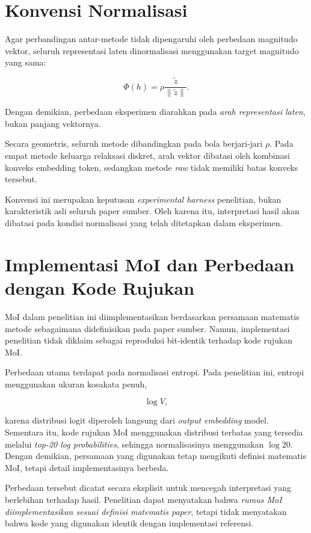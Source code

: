 \section{Konvensi Normalisasi}

Agar perbandingan antar-metode tidak dipengaruhi oleh perbedaan magnitudo vektor, seluruh representasi laten dinormalisasi menggunakan target magnitudo yang sama:

\begin{equation}
\Phi(h)
=
\rho
\frac{\tilde z}{\|\tilde z\|}.
\end{equation}

Dengan demikian, perbedaan eksperimen diarahkan pada \textit{arah representasi laten}, bukan panjang vektornya.

Secara geometris, seluruh metode dibandingkan pada bola berjari-jari \(\rho\). Pada empat metode keluarga relaksasi diskret, arah vektor dibatasi oleh kombinasi konveks embedding token, sedangkan metode \textit{raw} tidak memiliki batas konveks tersebut.

Konvensi ini merupakan keputusan \textit{experimental harness} penelitian, bukan karakteristik asli seluruh paper sumber. Oleh karena itu, interpretasi hasil akan dibatasi pada kondisi normalisasi yang telah ditetapkan dalam eksperimen.

\section{Implementasi MoI dan Perbedaan dengan Kode Rujukan}

MoI dalam penelitian ini diimplementasikan berdasarkan persamaan matematis metode sebagaimana didefinisikan pada paper sumber. Namun, implementasi penelitian tidak diklaim sebagai reproduksi bit-identik terhadap kode rujukan MoI.

Perbedaan utama terdapat pada normalisasi entropi. Pada penelitian ini, entropi menggunakan ukuran kosakata penuh,

\[
\log V,
\]

karena distribusi logit diperoleh langsung dari \textit{output embedding} model. Sementara itu, kode rujukan MoI menggunakan distribusi terbatas yang tersedia melalui \textit{top-20 log probabilities}, sehingga normalisasinya menggunakan \(\log20\). Dengan demikian, persamaan yang digunakan tetap mengikuti definisi matematis MoI, tetapi detail implementasinya berbeda.

Perbedaan tersebut dicatat secara eksplisit untuk mencegah interpretasi yang berlebihan terhadap hasil. Penelitian dapat menyatakan bahwa \textit{rumus MoI diimplementasikan sesuai definisi matematis paper}, tetapi tidak menyatakan bahwa kode yang digunakan identik dengan implementasi referensi.


